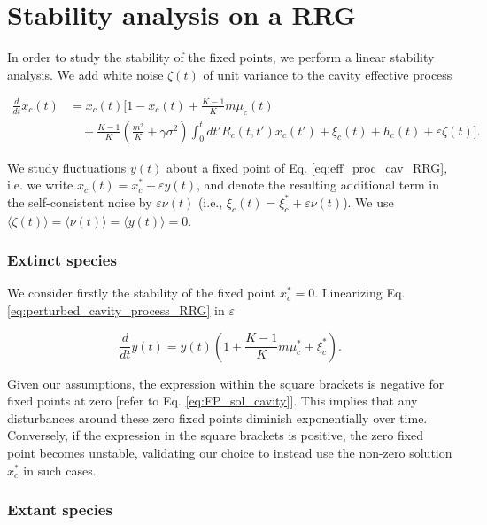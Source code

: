 \documentclass[
    preprint,
    linenumbers,
    amsmath,amssymb,amsfonts,
    aps, physrev,
    superscriptaddress,
    10pt,
    bibnotes
    ]{revtex4-2}
\begin{document}
\section{\label{sec:FP_stability_analysis_RRG}Stability analysis
on a RRG}

In order to study the stability of the fixed points, we perform a
linear stability analysis. We add white noise $\zeta(t)$ of unit
variance to the cavity effective process

\begin{align}
\frac{d}{dt}x_{c}(t) & =x_{c}(t)\Biggl[1-x_{c}(t)+\frac{K-1}{K}m\mu_{c}(t)\nonumber \\
 & \quad+\frac{K-1}{K}\left(\frac{m^{2}}{K}+\gamma\sigma^{2}\right)\int_{0}^{t}dt'R_{c}(t,t')x_{c}(t')+\xi_{c}(t)+h_{c}(t)+\varepsilon\zeta(t)\Biggr].\label{eq:perturbed_cavity_process_RRG}
\end{align}

We study fluctuations $y(t)$ about a fixed point of Eq. \eqref{eq:eff_proc_cav_RRG},
i.e. we write $x_{c}(t)=x_{c}^{*}+\varepsilon y(t)$, and denote the
resulting additional term in the self-consistent noise by $\varepsilon\nu(t)$
(i.e., $\xi_{c}(t)=\xi_{c}^{*}+\varepsilon\nu(t)$). We use $\langle\zeta(t)\rangle=\langle\nu(t)\rangle=\langle y(t)\rangle=0$. 

\subsubsection{Extinct species}

We consider firstly the stability of the fixed point $x_{c}^{*}=0$.
Linearizing Eq. \eqref{eq:perturbed_cavity_process_RRG} in $\varepsilon$

\begin{equation}
\frac{d}{dt}y(t)=y(t)\left(1+\frac{K-1}{K}m\mu_{c}^{*}+\xi_{c}^{*}\right).
\end{equation}

Given our assumptions, the expression within the square brackets is
negative for fixed points at zero {[}refer to Eq. \eqref{eq:FP_sol_cavity}{]}.
This implies that any disturbances around these zero fixed points
diminish exponentially over time. Conversely, if the expression in
the square brackets is positive, the zero fixed point becomes unstable,
validating our choice to instead use the non-zero solution $x_{c}^{*}$
in such cases.

\subsubsection{Extant species}
\end{document}

